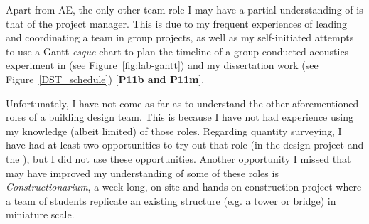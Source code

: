 Apart from AE, the only other team role I may have a partial understanding of is that of the project manager.
This is due to my frequent experiences of leading and coordinating a team in group projects,
as well as my self-initiated attempts to use a Gantt-\textit{esque} chart to plan the timeline of a group-conducted acoustics experiment in \LABTitle \space (see Figure~\ref{fig:lab-gantt})
and
my dissertation work (see Figure~\ref{DST_schedule}) [\textbf{P11b and P11m}].

Unfortunately, I have not come as far as to understand the other aforementioned roles of a building design team.
This is because I have not had experience using my knowledge (albeit limited) of those roles.
Regarding quantity surveying, I have had at least two opportunities to try out that role (in the \CASTitle \space design project and the \PRJTitle), but I did not use these opportunities.
Another opportunity I missed that may have improved my understanding of some of these roles is \textit{Constructionarium}, a week-long, on-site and hands-on construction project where a team of students replicate an existing structure (e.g. a tower or bridge) in miniature scale.
